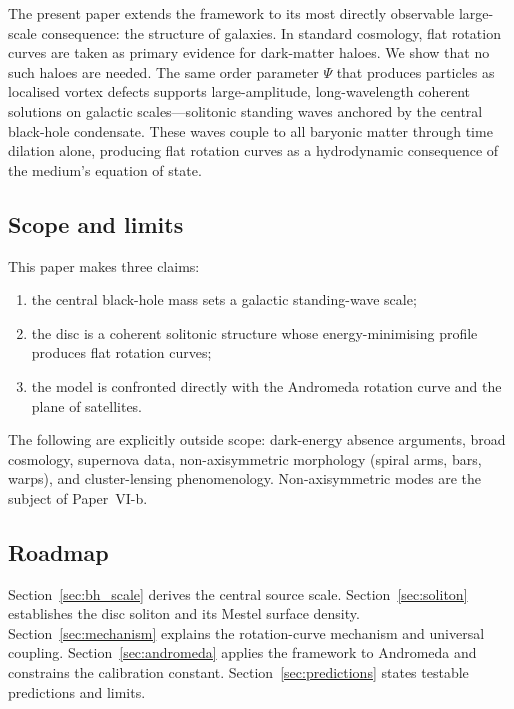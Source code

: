 \documentclass[11pt,a4paper]{article}
\begin{document}
The present paper extends the framework to its most directly observable large-scale
consequence: the structure of galaxies.  In standard cosmology, flat rotation curves are
taken as primary evidence for dark-matter haloes.  We show that no such haloes are needed.
The same order parameter $\Psi$ that produces particles as localised vortex defects supports
large-amplitude, long-wavelength coherent solutions on galactic scales---solitonic standing
waves anchored by the central black-hole condensate.  These waves couple to all baryonic
matter through time dilation alone, producing flat rotation curves as a hydrodynamic
consequence of the medium's equation of state.

\subsection*{Scope and limits}

This paper makes three claims:
\begin{enumerate}
  \item the central black-hole mass sets a galactic standing-wave scale;
  \item the disc is a coherent solitonic structure whose energy-minimising profile produces
    flat rotation curves;
  \item the model is confronted directly with the Andromeda rotation curve and the plane
    of satellites.
\end{enumerate}

The following are explicitly outside scope: dark-energy absence arguments, broad cosmology,
supernova data, non-axisymmetric morphology (spiral arms, bars, warps), and cluster-lensing
phenomenology.  Non-axisymmetric modes are the subject of Paper~VI-b.

\subsection*{Roadmap}

Section~\ref{sec:bh_scale} derives the central source scale.
Section~\ref{sec:soliton} establishes the disc soliton and its Mestel surface density.
Section~\ref{sec:mechanism} explains the rotation-curve mechanism and universal coupling.
Section~\ref{sec:andromeda} applies the framework to Andromeda and constrains the
calibration constant.
Section~\ref{sec:predictions} states testable predictions and limits.

\end{document}

